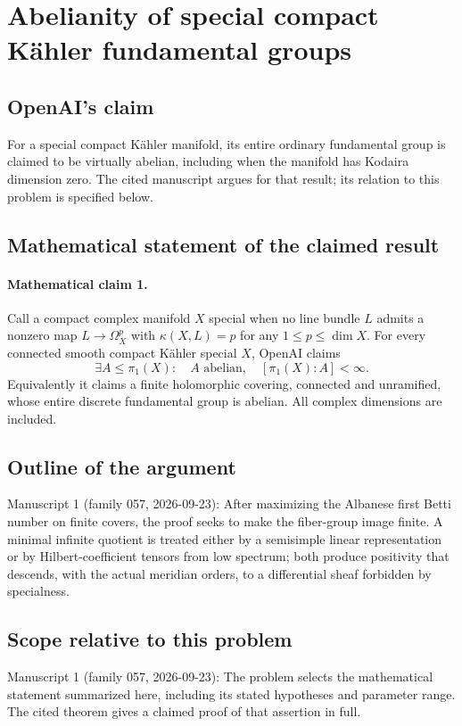 \documentclass[11pt]{article}
\begin{document}
\section*{Abelianity of special compact Kähler fundamental groups}

\subsection{OpenAI's claim}
For a special compact Kähler manifold, its entire ordinary fundamental group is claimed to be virtually abelian, including when the manifold has Kodaira dimension zero. The cited manuscript argues for that result; its relation to this problem is specified below.

\subsection{Mathematical statement of the claimed result}
\paragraph{Mathematical claim 1.} Call a compact complex manifold $X$ special when no line bundle $L$ admits a nonzero map $L\to\Omega_X^p$ with $\kappa(X,L)=p$ for any $1\le p\le\dim X$. For every connected smooth compact Kähler special $X$, OpenAI claims
\[
\exists A\le\pi_1(X):\quad A\text{ abelian},\quad[\pi_1(X):A]<\infty.
\]
Equivalently it claims a finite holomorphic covering, connected and unramified, whose entire discrete fundamental group is abelian. All complex dimensions are included.

\subsection{Outline of the argument}
Manuscript 1 (family 057, 2026-09-23): After maximizing the Albanese first Betti number on finite covers, the proof seeks to make the fiber-group image finite. A minimal infinite quotient is treated either by a semisimple linear representation or by Hilbert-coefficient tensors from low spectrum; both produce positivity that descends, with the actual meridian orders, to a differential sheaf forbidden by specialness.

\subsection{Scope relative to this problem}
Manuscript 1 (family 057, 2026-09-23): The problem selects the mathematical statement summarized here, including its stated hypotheses and parameter range. The cited theorem gives a claimed proof of that assertion in full.
\end{document}
